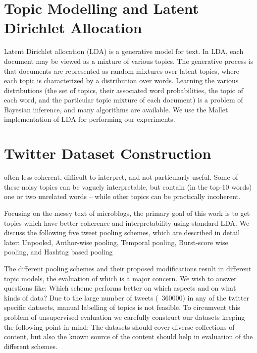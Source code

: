 \documentclass[10pt,a5paper,twoside]{article}
\begin{document}
\section{Topic Modelling and Latent Dirichlet Allocation}

Latent Dirichlet allocation (LDA) \cite{blei03} is a generative model
for text. In LDA, each document may be viewed as a mixture of various
topics.  The generative process is that documents are
represented as random mixtures over latent topics, where each topic is
characterized by a distribution over words.  Learning the various
distributions (the set of topics, their associated word probabilities,
the topic of each word, and the particular topic mixture of each
document) is a problem of Bayesian inference, and many algorithms are
available.  We use the Mallet \cite{mallet} implementation of LDA for
performing our experiments.


\section{Twitter Dataset Construction}

often less coherent, difficult to interpret, and not particularly useful. Some of these noisy topics can be vaguely interpretable, but contain (in the top-10 words) one or two unrelated words – while other topics can be practically incoherent. 

Focusing on the messy text of microblogs, the primary goal of this work is to get topics which have better coherence and interpretability using standard LDA. We discuss the following five tweet pooling schemes, which are described in detail later: Unpooled, Author-wise pooling, Temporal pooling,
Burst-score wise pooling, and Hashtag based pooling

The different pooling schemes and their proposed modifications result in different topic models, the evaluation of which is a major concern. We wish to answer questions like: Which scheme performs better on which aspects and on what kinds of data? Due to the large number of tweets (~360000) in any of the twitter specific datasets, manual labelling of topics is not feasible.
 To circumvent this problem of unsupervised evaluation we carefully construct our datasets keeping the following point in mind:
The datasets should cover diverse collections of content,
but also the known source of the content
should help in evaluation of the different schemes.
\end{document}
